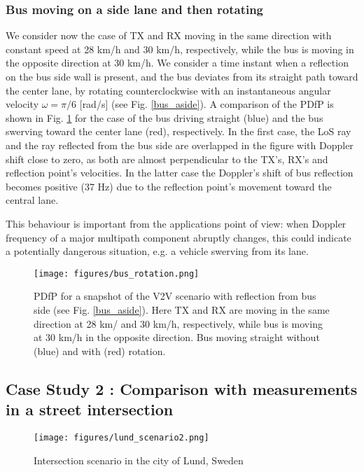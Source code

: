 \subsubsection{Bus moving on a side lane and then rotating}
We consider now the case of TX and RX moving in the same direction with constant speed at 28 km/h and 30 km/h, respectively, while the bus is moving in the opposite direction at 30 km/h. We consider a time instant when a reflection on the bus side wall is present, and the bus deviates from its straight path toward the center lane, by rotating counterclockwise with an instantaneous angular velocity $\omega=\pi/6$ [rad/s] (see Fig. \ref{bus_aside}). A comparison of the PDfP is shown in Fig. \ref{bus_rotation} for the case of the bus driving straight (blue) and the bus swerving toward the center lane (red), respectively.
In the first case, the LoS ray and the ray reflected from the bus side are overlapped in the figure with Doppler shift close to zero, as both are almost perpendicular to the TX's, RX's and reflection point's velocities.
In the latter case the Doppler's shift of bus reflection becomes positive (37 Hz) due to the reflection point's movement toward the central lane. \par 
This behaviour is important from the applications point of view: when Doppler frequency of a major multipath component abruptly changes, this could indicate a potentially dangerous situation, e.g. a vehicle swerving from its lane. 

\begin{figure}[h!]
	\centering
	\texttt{[image: figures/bus\_rotation.png]}
	\caption{PDfP for a snapshot of the V2V scenario with reflection from bus side (see Fig. \ref{bus_aside}). Here TX and RX are moving in the same direction at 28 km/ and 30 km/h, respectively, while bus is moving at 30 km/h in the opposite direction. Bus moving straight without (blue) and with (red) rotation.}
	\label{bus_rotation}
\end{figure}

\subsection{Case Study 2 : Comparison with measurements in a street intersection}

\begin{figure}[h!]
    \centering
    \texttt{[image: figures/lund\_scenario2.png]}
    \caption{Intersection scenario in the city of Lund, Sweden}
    \label{lund}
\end{figure}

